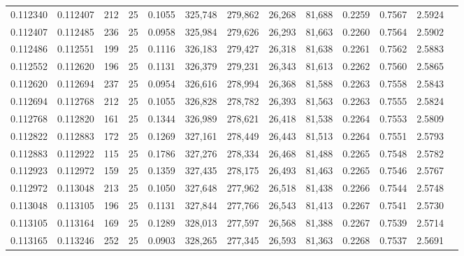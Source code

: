 \begin{tabular}{rrrrrrrrrrrrr}
0.112340 & 0.112407 &   212 &  25 &                                     0.1055 & 325,748 & 279,862 &  26,268 &  81,688 & 0.2259 & 0.7567 & 2.5924 \\
0.112407 & 0.112485 &   236 &  25 &                                     0.0958 & 325,984 & 279,626 &  26,293 &  81,663 & 0.2260 & 0.7564 & 2.5902 \\
0.112486 & 0.112551 &   199 &  25 &                                     0.1116 & 326,183 & 279,427 &  26,318 &  81,638 & 0.2261 & 0.7562 & 2.5883 \\
0.112552 & 0.112620 &   196 &  25 &                                     0.1131 & 326,379 & 279,231 &  26,343 &  81,613 & 0.2262 & 0.7560 & 2.5865 \\
0.112620 & 0.112694 &   237 &  25 &                                     0.0954 & 326,616 & 278,994 &  26,368 &  81,588 & 0.2263 & 0.7558 & 2.5843 \\
0.112694 & 0.112768 &   212 &  25 &                                     0.1055 & 326,828 & 278,782 &  26,393 &  81,563 & 0.2263 & 0.7555 & 2.5824 \\
0.112768 & 0.112820 &   161 &  25 &                                     0.1344 & 326,989 & 278,621 &  26,418 &  81,538 & 0.2264 & 0.7553 & 2.5809 \\
0.112822 & 0.112883 &   172 &  25 &                                     0.1269 & 327,161 & 278,449 &  26,443 &  81,513 & 0.2264 & 0.7551 & 2.5793 \\
0.112883 & 0.112922 &   115 &  25 &                                     0.1786 & 327,276 & 278,334 &  26,468 &  81,488 & 0.2265 & 0.7548 & 2.5782 \\
0.112923 & 0.112972 &   159 &  25 &                                     0.1359 & 327,435 & 278,175 &  26,493 &  81,463 & 0.2265 & 0.7546 & 2.5767 \\
0.112972 & 0.113048 &   213 &  25 &                                     0.1050 & 327,648 & 277,962 &  26,518 &  81,438 & 0.2266 & 0.7544 & 2.5748 \\
0.113048 & 0.113105 &   196 &  25 &                                     0.1131 & 327,844 & 277,766 &  26,543 &  81,413 & 0.2267 & 0.7541 & 2.5730 \\
0.113105 & 0.113164 &   169 &  25 &                                     0.1289 & 328,013 & 277,597 &  26,568 &  81,388 & 0.2267 & 0.7539 & 2.5714 \\
0.113165 & 0.113246 &   252 &  25 &                                     0.0903 & 328,265 & 277,345 &  26,593 &  81,363 & 0.2268 & 0.7537 & 2.5691 \\

\end{tabular}
